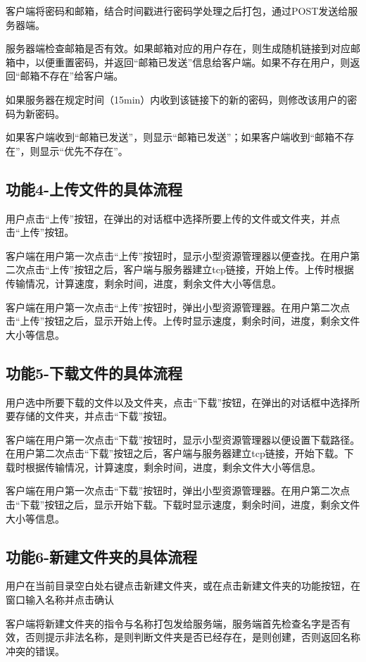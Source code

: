 客户端将密码和邮箱，结合时间戳进行密码学处理之后打包，通过POST发送给服务器端。

服务器端检查邮箱是否有效。如果邮箱对应的用户存在，则生成随机链接到对应邮箱中，以便重置密码，并返回“邮箱已发送”信息给客户端。如果不存在用户，则返回“邮箱不存在”给客户端。

如果服务器在规定时间（15min）内收到该链接下的新的密码，则修改该用户的密码为新密码。

如果客户端收到“邮箱已发送”，则显示“邮箱已发送”；如果客户端收到“邮箱不存在”，则显示“优先不存在”。

\subsection{功能4-上传文件的具体流程}

用户点击“上传”按钮，在弹出的对话框中选择所要上传的文件或文件夹，并点击“上传”按钮。

客户端在用户第一次点击“上传”按钮时，显示小型资源管理器以便查找。在用户第二次点击“上传”按钮之后，客户端与服务器建立tcp链接，开始上传。上传时根据传输情况，计算速度，剩余时间，进度，剩余文件大小等信息。

客户端在用户第一次点击“上传”按钮时，弹出小型资源管理器。在用户第二次点击“上传”按钮之后，显示开始上传。上传时显示速度，剩余时间，进度，剩余文件大小等信息。


\subsection{功能5-下载文件的具体流程}

用户选中所要下载的文件以及文件夹，点击“下载”按钮，在弹出的对话框中选择所要存储的文件夹，并点击“下载”按钮。

客户端在用户第一次点击“下载”按钮时，显示小型资源管理器以便设置下载路径。在用户第二次点击“下载”按钮之后，客户端与服务器建立tcp链接，开始下载。下载时根据传输情况，计算速度，剩余时间，进度，剩余文件大小等信息。

客户端在用户第一次点击“下载”按钮时，弹出小型资源管理器。在用户第二次点击“下载”按钮之后，显示开始下载。下载时显示速度，剩余时间，进度，剩余文件大小等信息。

\subsection{功能6-新建文件夹的具体流程}
用户在当前目录空白处右键点击新建文件夹，或在点击新建文件夹的功能按钮，在窗口输入名称并点击确认

客户端将新建文件夹的指令与名称打包发给服务端，服务端首先检查名字是否有效，否则提示非法名称，是则判断文件夹是否已经存在，是则创建，否则返回名称冲突的错误。

